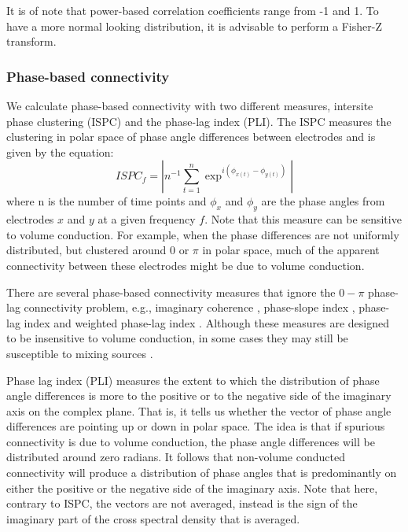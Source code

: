 \documentclass[11pt, onecolumn]{article}
\begin{document}
{It is of note that power-based correlation coefficients range from -1 and 1. To have a more normal looking distribution, it is advisable to perform a Fisher-Z transform.

\subsubsection{Phase-based connectivity}
We calculate phase-based connectivity with two different measures, intersite phase clustering (ISPC) and the phase-lag index (PLI). 
The ISPC measures the clustering in polar space of phase angle differences between electrodes and is given by the equation:
\begin{equation}
ISPC_f = | n^{-1} \sum_{t=1}^{n} \exp ^{i(\phi_{x(t)} -\phi_{y(t)})}|
\label{eq:ispc}
\end{equation}
where n is the number of time points and $\phi_x$ and $\phi_y$ are the phase angles from electrodes $x$ and $y$ at a given frequency $f$. Note that this measure can be sensitive to volume conduction. For example, when the phase differences are not uniformly distributed, but clustered around 0 or $\pi$ in polar space, much of the apparent connectivity between these electrodes might be due to volume conduction.

There are several phase-based connectivity measures that ignore the $0-\pi$ phase-lag connectivity problem, e.g., imaginary coherence \citep{nolte2004identifying}, phase-slope index \citep{nolte2008robustly}, phase-lag index \citep{stam2007phase} and weighted phase-lag index \cite{vinck2011improved}. Although these measures are designed to be insensitive to volume conduction, in
some cases they may still be susceptible to mixing sources \citep{peraza2012volume}.

Phase lag index (PLI) measures the extent to which the distribution of phase angle differences is more to the positive or to the negative side of the imaginary axis on the complex plane. That is, it tells us whether the vector of phase angle differences are pointing up or down in polar space. The idea is that if spurious connectivity is due to volume conduction, the phase angle differences will be distributed around zero radians. It follows that non-volume conducted connectivity will produce a distribution of phase angles that is predominantly on either the positive or the negative side of the imaginary axis. Note that here, contrary to ISPC, the vectors are not averaged, instead is the sign of the imaginary part of the cross spectral density that is averaged.

}
\end{document}

